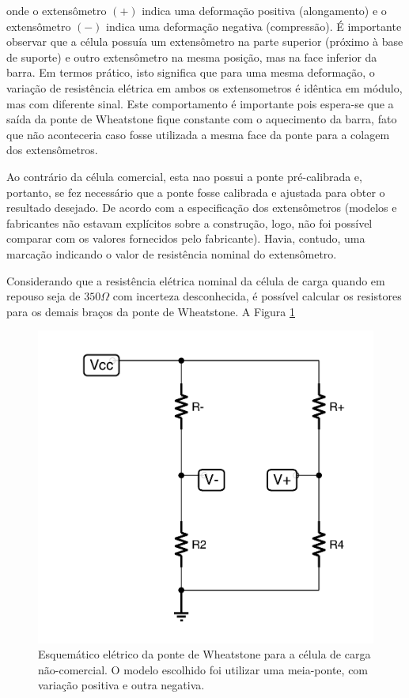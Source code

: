 \documentclass[a4paper]{instrumentacao}
\begin{document}
\noindent onde o extensômetro $(+)$ indica uma deformação positiva (alongamento) e o extensômetro $(-)$ indica uma deformação negativa (compressão). É importante observar que a célula possuía um extensômetro na parte superior (próximo à base de suporte) e outro extensômetro na mesma posição, mas na face inferior da barra. Em termos prático, isto significa que para uma mesma deformação, o variação de resistência elétrica em ambos os extensometros é idêntica em módulo, mas com diferente sinal. Este comportamento é importante pois espera-se que a saída da ponte de Wheatstone fique constante com o aquecimento da barra, fato que não aconteceria caso fosse utilizada a mesma face da ponte para a colagem dos extensômetros.

Ao contrário da célula comercial, esta nao possui a ponte pré-calibrada e, portanto, se fez necessário que a ponte fosse calibrada e ajustada para obter o resultado desejado. De acordo com a especificação dos extensômetros (modelos e fabricantes não estavam explícitos sobre a construção, logo, não foi possível comparar com os valores fornecidos pelo fabricante). Havia, contudo, uma marcação indicando o valor de resistência nominal do extensômetro.

Considerando que a resistência elétrica nominal da célula de carga quando em repouso seja de $350 \Omega$ com incerteza desconhecida, é possível calcular os resistores para os demais braços da ponte de Wheatstone. A Figura \ref{fig:celula-nao-comercial-ponte}

\begin{figure}[H]
\center
\includegraphics[width=\textwidth]{WheatstoneNaoComercial.pdf}
\caption{Esquemático elétrico da ponte de Wheatstone para a célula de carga não-comercial. O modelo escolhido foi utilizar uma meia-ponte, com variação positiva e outra negativa.}
\label{fig:celula-nao-comercial-ponte}
\end{figure}
\end{document}
